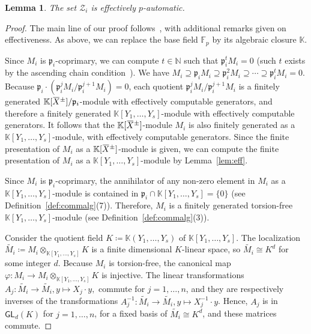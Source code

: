 \documentclass[a4paper,UKenglish,cleveref, autoref, thm-restate]{lipics-v2021}
\newcommand{\N}{\mathbb{N}}
\newcommand{\K}{\mathbb{K}}
\newcommand{\F}{\mathbb{F}}
\newcommand{\GL}{\mathsf{GL}}
\newcommand{\mZ}{\mathcal{Z}}
\newcommand{\oX}{\mkern 1.5mu\overline{\mkern-1.5mu X \mkern-1.5mu}\mkern 1.5mu}
\newcommand{\frp}{\mathfrak{p}}
\newtheorem{lem}[thrm]{Lemma}
\theoremstyle{definition}
\theoremstyle{definition}
\theoremstyle{definition}
\begin{document}
\begin{lem}\label{lem:primary}
    The set $\mZ_i$ is effectively $p$-automatic.
\end{lem}
\begin{proof}
	The main line of our proof follows~\cite[Lemma~9.7-9.8]{derksen2007skolem}, with additional remarks given on effectiveness. 
	As above, we can replace the base field $\F_p$ by its algebraic closure $\K$. 

    Since $M_i$ is $\frp_i$-coprimary, we can compute $t \in \N$ such that $\frp_i^t M_i = 0$ (such $t$ exists by the ascending chain condition~\cite[Chapter~1.4]{eisenbud2013commutative}).
    We have
    $
    M_i \supseteq \frp_i M_i \supseteq \frp_i^2 M_i \supseteq \cdots \supseteq \frp_i^t M_i = 0
    $.
    Because $\frp_i \cdot (\frp_i^{j} M_i/\frp_i^{j+1} M_i) = 0$, each quotient $\frp_i^{j} M_i/\frp_i^{j+1} M_i$ is a finitely generated $\K[\oX^{\pm}]/\frp_i$-module with effectively computable generators, and therefore a finitely generated $\K[Y_1, \ldots, Y_s]$-module with effectively computable generators.
    It follows that the $\K[\oX^{\pm}]$-module $M_i$ is also finitely generated as a $\K[Y_1, \ldots, Y_s]$-module, with effectively computable generators.
    Since the finite presentation of $M_i$ as a $\K[\oX^{\pm}]$-module is given, we can compute the finite presentation of $M_i$ as a $\K[Y_1, \ldots, Y_s]$-module by Lemma~\ref{lem:eff}.

    Since $M_i$ is $\frp_i$-coprimary, the annihilator of any non-zero element in $M_i$ as a $\K[Y_1, \ldots, Y_s]$-module is contained in $\frp_i \cap \K[Y_1, \ldots, Y_s] = \{0\}$ (see Definition~\ref{def:commalg}(7)). Therefore, $M_i$ is a finitely generated torsion-free $\K[Y_1, \ldots, Y_s]$-module (see Definition~\ref{def:commalg}(3)). 
    
    Consider the quotient field $K \coloneqq \K(Y_1, \ldots, Y_s)$ of $\K[Y_1, \ldots, Y_s]$. The localization $\widetilde{M_i} \coloneqq M_i \otimes_{\K[Y_1, \ldots, Y_s]} K$ is a finite dimensional $K$-linear space, so $\widetilde{M_i} \cong K^d$ for some integer $d$.
    Because $M_i$ is torsion-free, the canonical map $\varphi \colon M_i \rightarrow M_i \otimes_{\K[Y_1, \ldots, Y_s]} K$ is injective.
    The linear transformations $A_j \colon \widetilde{M_i} \rightarrow \widetilde{M_i}, y \mapsto X_j \cdot y,$ commute for $j = 1, \ldots, n$, and they are respectively inverses of the transformations $A_j^{-1} \colon \widetilde{M_i} \rightarrow \widetilde{M_i}, y \mapsto X_j^{-1} \cdot y$. Hence, $A_j$ is in $\GL_d(K)$ for $j = 1, \ldots, n$, for a fixed basis of $\widetilde{M_i} \cong K^d$, and these matrices commute.


\end{proof}
\end{document}
